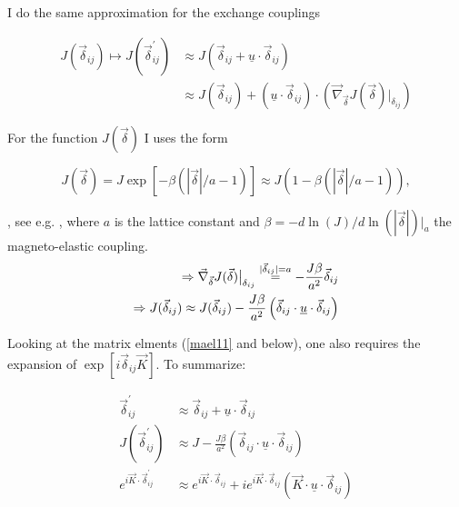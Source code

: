 \documentclass[../../../main.tex]{subfiles}
\begin{document}
I do the same approximation for the exchange couplings 

\begin{align}
	J(\vec{\delta}_{ij}) \mapsto J(\vec{\delta}_{ij}^\prime) &\approx J\left(\vec{\delta}_{ij} + \underline{u}\cdot\vec{\delta}_{ij}\right) \\
	&\approx J(\vec{\delta}_{ij}) + \left(\underline{u}\cdot\vec{\delta}_{ij}\right) \cdot \left( \vec{\nabla}_{\vec{\delta}}J(\vec{\delta})\big\rvert_{\delta_{ij}}\right)
\end{align}

For the function $J(\vec{\delta})$ I uses the form

\begin{equation}
	J(\vec{\delta}) = J\exp\left[-\beta\left(|\vec{\delta}|/a-1\right)\right] \approx J\left(1 -\beta\left(|\vec{\delta}|/a-1\right)\right),
\end{equation}

, see e.g. \cite{Pereira2009}, where $a$ is the lattice constant and $\beta = -d\ln(J)/d\ln(|\vec{\delta}|)\big\rvert_{a}$ the magneto-elastic coupling. \\

\begin{align}
	\Rightarrow \vec{\nabla}_{\vec{\delta}}J(\vec{\delta})\big\rvert_{\delta_{ij}} \overset{|\vec{\delta}_{ij}| = a}{=} -\frac{J\beta}{a^2} \vec{\delta}_{ij} \notag  \\
	\Rightarrow J(\vec{\delta}_{ij}) \approx J(\vec{\delta}_{ij}) - \frac{J\beta}{a^2}\left( \vec{\delta}_{ij} \cdot \underline{u} \cdot \vec{\delta}_{ij} \right)
\end{align}



Looking at the matrix elments (\ref{mael11} and below), one also requires the expansion of $\exp[i\vec{\delta}_{ij}\vec{K}]$. To summarize:

\begin{align}
	\vec{\delta}_{ij}^\prime &\approx \vec{\delta}_{ij} + \underline{u} \cdot \vec{\delta}_{ij} \\
	J(\vec{\delta}_{ij}^\prime) &\approx J - \frac{J\beta}{a^2}\left( \vec{\delta}_{ij} \cdot \underline{u} \cdot \vec{\delta}_{ij}\right) \\
	e^{i\vec{K} \cdot \vec{\delta}_{ij}^\prime} &\approx e^{i\vec{K}\cdot\vec{\delta}_{ij}} + ie^{i\vec{K}\cdot\vec{\delta}_{ij}}\left( \vec{K} \cdot \underline{u} \cdot \vec{\delta}_{ij}
	\right)
\end{align}
\end{document}
